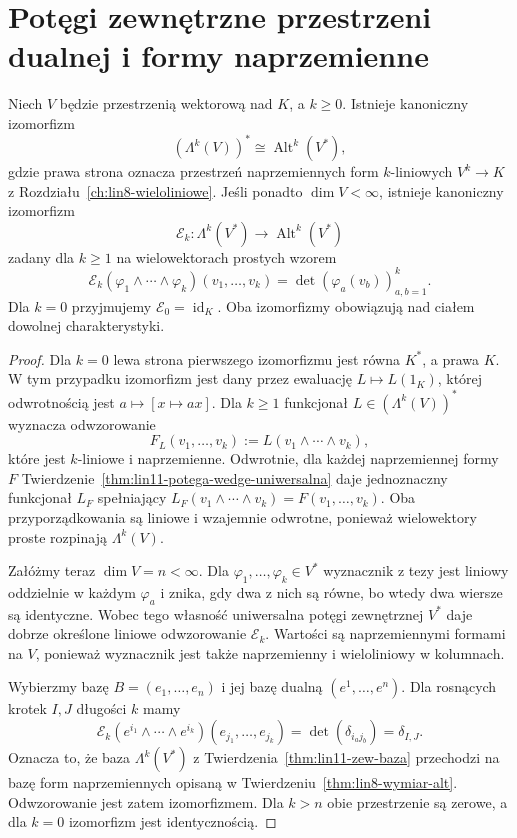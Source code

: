 \section{Potęgi zewnętrzne przestrzeni dualnej i formy naprzemienne}
\label{sec:lin11-dual-formy}

\begin{twierdzenie}
\label{thm:lin11-formy-alt}
Niech \(V\) będzie przestrzenią
wektorową nad \(K\), a \(k\ge0\).
Istnieje kanoniczny izomorfizm
\[
 (\Lambda^k(V))^*
 \cong \operatorname{Alt}^k(V^*),
\]
gdzie prawa strona oznacza
przestrzeń naprzemiennych form
\(k\)-liniowych \(V^k\to K\)
z Rozdziału~\ref{ch:lin8-wieloliniowe}.
Jeśli ponadto \(\dim V<\infty\),
istnieje kanoniczny izomorfizm
\[
 \mathcal E_k\colon
 \Lambda^k(V^*)\longrightarrow
 \operatorname{Alt}^k(V^*)
\]
zadany dla \(k\ge1\) na
wielowektorach prostych wzorem
\[
 \mathcal E_k(\varphi_1\wedge\cdots\wedge\varphi_k)
 (v_1,\ldots,v_k)
 =\det(\varphi_a(v_b))_{a,b=1}^k.
\]
Dla \(k=0\) przyjmujemy
\(\mathcal E_0=\operatorname{id}_K\).
Oba izomorfizmy obowiązują
nad ciałem dowolnej charakterystyki.
\end{twierdzenie}
\begin{proof}
Dla \(k=0\) lewa strona pierwszego
izomorfizmu jest równa \(K^*\), a prawa
\(K\). W tym przypadku izomorfizm
jest dany przez ewaluację
\(L\mapsto L(1_K)\), której
odwrotnością jest
\(a\mapsto[x\mapsto ax]\).
Dla \(k\ge1\) funkcjonał
\(L\in(\Lambda^k(V))^*\)
wyznacza odwzorowanie
\[
 F_L(v_1,\ldots,v_k)
 :=L(v_1\wedge\cdots\wedge v_k),
\]
które jest \(k\)-liniowe
i naprzemienne.
Odwrotnie, dla każdej
naprzemiennej formy \(F\)
Twierdzenie~\ref{thm:lin11-potega-wedge-uniwersalna}
daje jednoznaczny funkcjonał
\(L_F\) spełniający
\(L_F(v_1\wedge\cdots\wedge v_k)
=F(v_1,\ldots,v_k)\).
Oba przyporządkowania są
liniowe i wzajemnie odwrotne,
ponieważ wielowektory proste
rozpinają \(\Lambda^k(V)\).

Załóżmy teraz \(\dim V=n<\infty\).
Dla \(\varphi_1,\ldots,\varphi_k\in V^*\)
wyznacznik z tezy jest
liniowy oddzielnie w każdym
\(\varphi_a\) i znika,
gdy dwa z nich są równe,
bo wtedy dwa wiersze są
identyczne.
Wobec tego własność uniwersalna
potęgi zewnętrznej \(V^*\)
daje dobrze określone liniowe
odwzorowanie \(\mathcal E_k\).
Wartości są naprzemiennymi
formami na \(V\), ponieważ
wyznacznik jest także
naprzemienny i wieloliniowy
w kolumnach.

Wybierzmy bazę
\(B=(e_1,\ldots,e_n)\)
i jej bazę dualną
\((e^1,\ldots,e^n)\).
Dla rosnących krotek \(I,J\)
długości \(k\) mamy
\[
 \mathcal E_k(
 e^{i_1}\wedge\cdots\wedge e^{i_k})
 (e_{j_1},\ldots,e_{j_k})
 =\det(\delta_{i_a j_b})
 =\delta_{I,J}.
\]
Oznacza to, że baza
\(\Lambda^k(V^*)\) z
Twierdzenia~\ref{thm:lin11-zew-baza}
przechodzi na bazę form
naprzemiennych opisaną w
Twierdzeniu~\ref{thm:lin8-wymiar-alt}.
Odwzorowanie jest zatem
izomorfizmem.
Dla \(k>n\) obie przestrzenie
są zerowe, a dla \(k=0\)
izomorfizm jest identycznością.
\end{proof}

